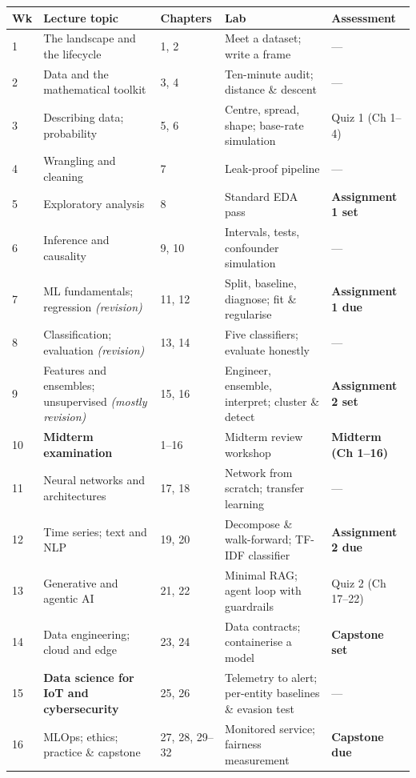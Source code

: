 \begin{longtable}{@{}L{1.1cm}L{3.4cm}L{3.4cm}L{3.1cm}L{2.6cm}@{}}
\toprule
{}
\textbf{Wk} & \textbf{Lecture topic} & \textbf{Chapters} & \textbf{Lab} & \textbf{Assessment} \\
\midrule
{} & The landscape and the lifecycle & 1, 2 & Meet a dataset; write a frame & --- \\
2 & Data and the mathematical toolkit & 3, 4 & Ten-minute audit; distance \& descent & --- \\
3 & Describing data; probability & 5, 6 & Centre, spread, shape; base-rate simulation & Quiz 1 (Ch 1--4) \\
4 & Wrangling and cleaning & 7 & Leak-proof pipeline & --- \\
5 & Exploratory analysis & 8 & Standard EDA pass & \textbf{Assignment 1 set} \\
6 & Inference and causality & 9, 10 & Intervals, tests, confounder simulation & --- \\
7 & ML fundamentals; regression \emph{(revision)} & 11, 12 & Split, baseline, diagnose; fit \& regularise & \textbf{Assignment 1 due} \\
8 & Classification; evaluation \emph{(revision)} & 13, 14 & Five classifiers; evaluate honestly & --- \\
9 & Features and ensembles; unsupervised \emph{(mostly revision)} & 15, 16 & Engineer, ensemble, interpret; cluster \& detect & \textbf{Assignment 2 set} \\
10 & \textbf{Midterm examination} & 1--16 & Midterm review workshop & \textbf{Midterm (Ch 1--16)} \\
11 & Neural networks and architectures & 17, 18 & Network from scratch; transfer learning & --- \\
12 & Time series; text and NLP & 19, 20 & Decompose \& walk-forward; TF-IDF classifier & \textbf{Assignment 2 due} \\
13 & Generative and agentic AI & 21, 22 & Minimal RAG; agent loop with guardrails & Quiz 2 (Ch 17--22) \\
14 & Data engineering; cloud and edge & 23, 24 & Data contracts; containerise a model & \textbf{Capstone set} \\
15 & \textbf{Data science for IoT and cybersecurity} & 25, 26 & Telemetry to alert; per-entity baselines \& evasion test & --- \\
16 & MLOps; ethics; practice \& capstone & 27, 28, 29--32 & Monitored service; fairness measurement & \textbf{Capstone due} \\
\bottomrule
\end{longtable}

